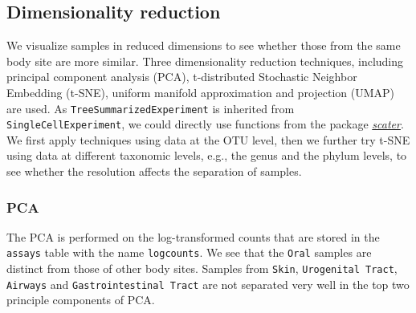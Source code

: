 \documentclass[]{article}
\begin{document}
\hypertarget{dimensionality-reduction}{%
\subsection{Dimensionality reduction}\label{dimensionality-reduction}}

We visualize samples in reduced dimensions to see whether those from the same body site are more similar. Three dimensionality reduction techniques, including principal component analysis (PCA), t-distributed Stochastic Neighbor Embedding (t-SNE), uniform manifold approximation and projection (UMAP) are used. As \texttt{TreeSummarizedExperiment} is inherited from \texttt{SingleCellExperiment}, we could directly use functions from the package \emph{\href{https://bioconductor.org/packages/3.11/scater}{scater}}. We first apply techniques using data at the OTU level, then we further try t-SNE using data at different taxonomic levels, e.g., the genus and the phylum levels, to see whether the resolution affects the separation of samples.

\hypertarget{pca}{%
\subsubsection{PCA}\label{pca}}

The PCA is performed on the log-transformed counts that are stored in the \texttt{assays} table with the name \texttt{logcounts}. We see that the \texttt{Oral} samples are distinct from those of other body sites. Samples from \texttt{Skin}, \texttt{Urogenital Tract}, \texttt{Airways} and \texttt{Gastrointestinal Tract} are not separated very well in the top two principle components of PCA.
\end{document}

